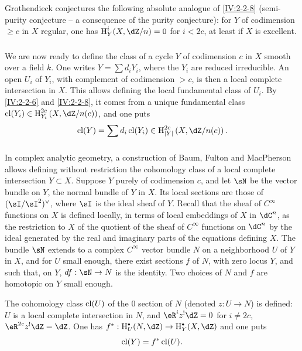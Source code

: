 Grothendieck conjectures the following absolute analogue of \ref{IV:2-2-8} (semi-purity
conjecture -- a consequence of the purity conjecture): for $Y$
of codimension $\geqslant c$ in $X$ regular, one has $\h_Y^i(X,\dZ/n)=0$ for
$i<2 c$, at least if $X$ is excellent.




\subsubsection{}\label{IV:2-2-10}

We are now ready to define the class of a cycle $Y$ of
codimension $c$ in $X$ smooth over a field $k$. One writes $Y=\sum d_i Y_i$,
where the $Y_i$ are reduced irreducible. An open $U_i$ of $Y_i$, with
complement of codimension $>c$, is then a local complete
intersection in $X$. This allows defining the local fundamental class of
$U_i$. By \ref{IV:2-2-6} and \ref{IV:2-2-8}, it comes from a
unique fundamental class $\cl(Y_i)\in \h_{Y_i}^{2 c}\left(X,\dZ/n(c)\right)$,
and one puts
\[
  \cl(Y) = \sum d_i \cl(Y_i) \in \h_{|Y|}^{2 c}\left(X,\dZ/n(c)\right) \text{.}
\]




\subsubsection{}\label{IV:2-2-11}

In complex analytic geometry, a construction of Baum, Fulton and
MacPherson \cite{bfm75} allows defining without restriction the
cohomology class of a local complete intersection $Y\subset X$. Suppose $Y$
purely of codimension $c$, and let $\sN$ be the vector bundle on $Y$, the
normal bundle of $Y$ in $X$. Its local sections are those of $(\sI/\sI^2)^\vee$,
where $\sI$ is the ideal sheaf of $Y$. Recall that the sheaf of
$C^\infty$ functions on $X$ is defined locally, in terms of local
embeddings of $X$ in $\dC^n$, as the restriction to $X$ of the quotient of the
sheaf of $C^\infty$ functions on $\dC^n$ by the ideal generated by the
real and imaginary parts of the equations defining $X$. The
bundle $\sN$ extends to a complex $C^\infty$ vector bundle $N$ on a
neighborhood $U$ of $Y$ in $X$, and for $U$ small enough, there exist sections
$f$ of $N$, with zero locus $Y$, and such that, on $Y$, $d f:\sN\to N$
is the identity. Two choices of $N$ and $f$ are homotopic on $Y$ small enough.

The cohomology class $\operatorname{cl}(U)$ of the $0$ section of $N$ (denoted $z:U\to N$)
is defined: $U$ is a local complete intersection in $N$, and
$\eR^i z^!\dZ = 0$ for $i\ne 2 c$, $\eR^{2 c} z^!\dZ = \dZ$. One has
$f^*:\h_U^\bullet(N,\dZ) \to \h_Y^\bullet(X,\dZ)$ and one puts
\[
  \operatorname{cl}(Y) = f^*\operatorname{cl}(U) \text{.}
\]

